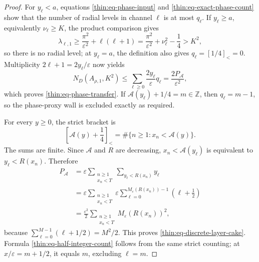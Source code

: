 \documentclass[11pt]{article}
\numberwithin{equation}{section}
\theoremstyle{definition}
\theoremstyle{remark}
\begin{document}
\begin{proof}
For \(y_\ell<a\), equations \eqref{thin:eq-phase-input} and
\eqref{thin:eq-exact-phase-count} show that the number of radial levels in
channel \(\ell\) is at most \(q_\ell\).  If \(y_\ell\geq a\), equivalently
\(\nu_\ell\geq K\), the product comparison gives
\[
  \lambda_{\ell,1}
  \geq\frac{\pi^2}{\varepsilon^2}+\ell(\ell+1)
  =\frac{\pi^2}{\varepsilon^2}+\nu_\ell^2-\frac14
  >K^2,
\]
so there is no radial level; at \(y_\ell=a\), the definition also gives
\(q_\ell=[1/4]_< =0\).  Multiplicity \(2\ell+1=2y_\ell/\varepsilon\)
now yields
\[
  N_D(A_{\rho,1},K^2)
  \leq\sum_{\ell\geq0}\frac{2y_\ell}{\varepsilon}q_\ell
  =\frac{2P_{\mathcal A}}{\varepsilon^2},
\]
which proves \eqref{thin:eq-phase-transfer}.  If
\(\mathcal A(y_\ell)+1/4=m\in\mathbb Z\), then \(q_\ell=m-1\), so the
phase-proxy wall is excluded exactly as required.

For every \(y\geq0\), the strict bracket is
\[
  \left[\mathcal A(y)+\frac14\right]_<
  =\#\{n\geq1:x_n<\mathcal A(y)\}.
\]
The sums are finite.  Since \(\mathcal A\) and \(R\) are decreasing,
\(x_n<\mathcal A(y_\ell)\) is equivalent to \(y_\ell<R(x_n)\).  Therefore
\[
\begin{aligned}
  P_{\mathcal A}
  &=\varepsilon
    \sum_{\substack{n\geq1\\x_n<T}}
      \sum_{y_\ell<R(x_n)}y_\ell \\
  &=\varepsilon
    \sum_{\substack{n\geq1\\x_n<T}}
      \varepsilon\sum_{\ell=0}^{M_\varepsilon(R(x_n))-1}
        \left(\ell+\frac12\right) \\
  &=\frac{\varepsilon^2}{2}
    \sum_{\substack{n\geq1\\x_n<T}}
      M_\varepsilon(R(x_n))^2,
\end{aligned}
\]
because \(\sum_{\ell=0}^{M-1}(\ell+1/2)=M^2/2\).  This proves
\eqref{thin:eq-discrete-layer-cake}.  Formula
\eqref{thin:eq-half-integer-count} follows from the same strict counting;
at \(x/\varepsilon=m+1/2\), it equals \(m\), excluding \(\ell=m\).


\end{proof}
\end{document}
